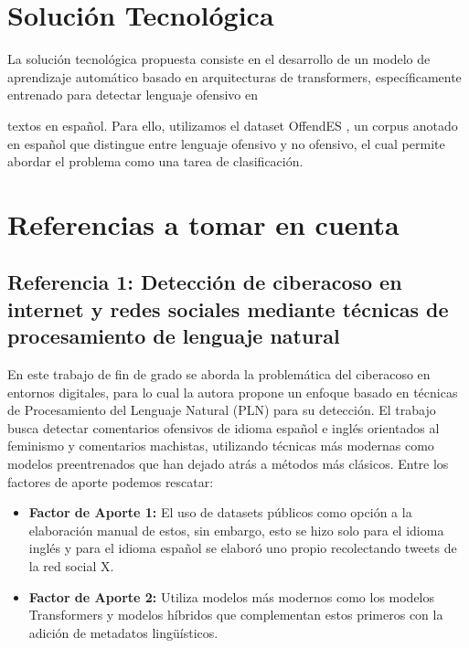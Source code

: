 \section{Solución Tecnológica}

La solución tecnológica propuesta consiste en el desarrollo de un modelo de aprendizaje automático basado en arquitecturas de transformers, específicamente entrenado para detectar lenguaje ofensivo en




\vspace{0.5cm}

textos en español. Para ello, utilizamos el dataset OffendES \cite{plazadelarco2021offendes}, un corpus anotado en español que distingue entre lenguaje ofensivo y no ofensivo, el cual permite abordar el problema como una tarea de clasificación.

\section{Referencias a tomar en cuenta}

\subsection{Referencia 1: Detección de ciberacoso en internet y redes sociales mediante técnicas de procesamiento de lenguaje natural}

En este trabajo de fin de grado se aborda la problemática del ciberacoso en entornos digitales, para lo cual la autora propone un enfoque basado en técnicas de Procesamiento del Lenguaje Natural (PLN) para su detección. El trabajo busca detectar comentarios ofensivos de idioma español e inglés orientados al feminismo y comentarios machistas, utilizando técnicas más modernas como modelos preentrenados que han dejado atrás a métodos más clásicos. Entre los factores de aporte podemos rescatar:

\begin{itemize}
    \item \textbf{Factor de Aporte 1:} El uso de datasets públicos como opción a la elaboración manual de estos, sin embargo, esto se hizo solo para el idioma inglés y para el idioma español se elaboró uno propio recolectando tweets de la red social X.
    \item \textbf{Factor de Aporte 2:} Utiliza modelos más modernos como los modelos Transformers y modelos híbridos que complementan estos primeros con la adición de metadatos lingüísticos.
\end{itemize}

